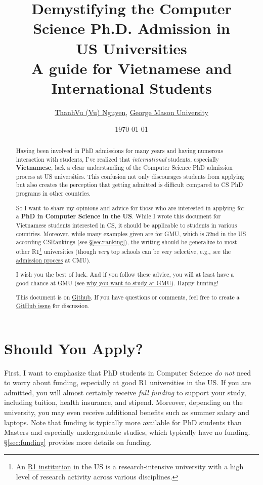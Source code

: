 \documentclass[11pt]{article}
\title{Demystifying the Computer Science Ph.D. Admission in \\US Universities\\{\Large A guide for Vietnamese and International Students}}
\date{\today}
\author{\small \href{https://nguyenthanhvuh.github.io}{ThanhVu (Vu) Nguyen}, \href{https://cs.gmu.edu}{George Mason University}}
\begin{document}
\maketitle

\begin{abstract}
Having been involved in PhD admissions for many years and having
numerous interaction with  students, I've
realized that \emph{international} students, especially \textbf{Vietnamese}, lack a clear understanding of
the Computer Science PhD admission process at US universities. This confusion not only
discourages students from applying but also creates the perception that
getting admitted is difficult compared to CS PhD programs in other countries.

So I want to share my opinions and advice for those who are interested in applying for a \textbf{PhD in Computer Science in the US}.
While I wrote this document for Vietnamese students interested in CS, it should be applicable to students in various countries.
Moreover, while many examples given are for GMU, which is 32nd in the US according CSRankings (see \S\ref{sec:ranking}), the writing should be generalize to most other R1\footnote{An \href{https://en.wikipedia.org/wiki/List_of_research_universities_in_the_United_States}{R1 institution} in the US is a research-intensive university with a high level of research activity across various disciplines.} universities  (though \emph{very} top schools can be very selective, e.g., see the \href{https://da-data.blogspot.com/2015/03/reflecting-on-cs-graduate-admissions.html}{admission process} at CMU).

I wish you the best of luck. And if you follow these advice,
you will at least have a good chance at GMU (see
\href{https://github.com/dynaroars/dynaroars.github.io/wiki/About-GMU}{why
you want to study at GMU}). Happy hunting!

This document is on \href{https://github.com/nguyenthanhvuh/phd-cs-us}{Github}. If you have questions or comments, feel free to create a \href{https://github.com/nguyenthanhvuh/phd-cs-us/issues}{GitHub issue} for discussion.
\end{abstract}

\section{Should You Apply?}

First, I want to emphasize that PhD students in Computer
Science \emph{do not} need to worry about funding, especially at good R1
universities in the US. If you are admitted, you will almost certainly
receive \emph{full funding} to support your study, including tuition,
health insurance, and stipend. Moreover, depending on the university,
you may even receive additional benefits such as summer salary and laptops. Note that
funding is typically more available for PhD students than 
Masters and especially undergraduate studies, which typically have no funding. \S\ref{sec:funding} provides more details on funding.
\end{document}
